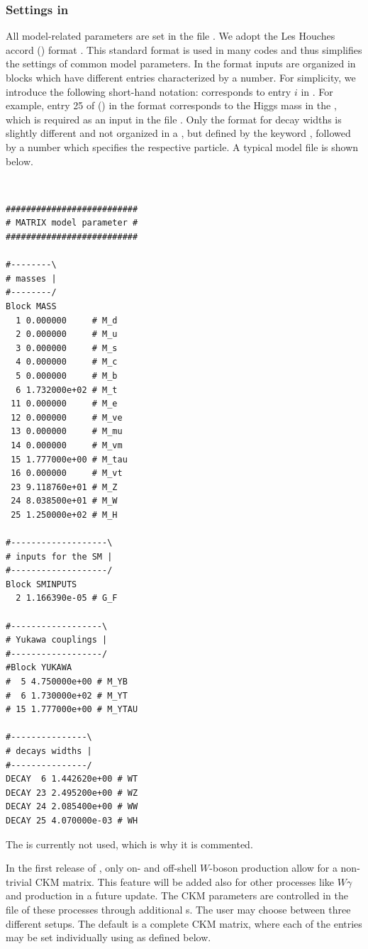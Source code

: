 \documentclass[english,11pt]{article}
\begin{document}
\subsubsection{Settings in }\label{sec:model}
All model-related parameters are set in the file . We adopt 
the \susy{} Les Houches accord (\slha{}) format \cite{Skands:2003cj}. This standard 
format is used in many codes and thus simplifies the settings of common 
model parameters. In the \slha{} format inputs are organized in blocks which have different entries characterized by a number. For 
simplicity, we introduce the following short-hand notation:  corresponds to entry $i$ in . 
For example, entry 25 of  () in the \slha{} format corresponds to the Higgs mass in the \sm{}, which 
is required as an input in the file . Only the format for decay widths is slightly different and not organized in a , but defined by the keyword , followed by a number which specifies the respective particle. A typical model file is shown below.

\lstset{basicstyle=\scriptsize, frame=single}
{\tt
\begin{lstlisting}
##########################
# MATRIX model parameter #
##########################

#--------\
# masses |
#--------/
Block MASS
  1 0.000000     # M_d 
  2 0.000000     # M_u
  3 0.000000     # M_s
  4 0.000000     # M_c
  5 0.000000     # M_b 
  6 1.732000e+02 # M_t
 11 0.000000     # M_e 
 12 0.000000     # M_ve
 13 0.000000     # M_mu
 14 0.000000     # M_vm
 15 1.777000e+00 # M_tau
 16 0.000000     # M_vt
 23 9.118760e+01 # M_Z 
 24 8.038500e+01 # M_W
 25 1.250000e+02 # M_H 

#-------------------\
# inputs for the SM |
#-------------------/
Block SMINPUTS
  2 1.166390e-05 # G_F 

#------------------\
# Yukawa couplings |
#------------------/
#Block YUKAWA 
#  5 4.750000e+00 # M_YB 
#  6 1.730000e+02 # M_YT 
# 15 1.777000e+00 # M_YTAU 

#---------------\
# decays widths |
#---------------/
DECAY  6 1.442620e+00 # WT 
DECAY 23 2.495200e+00 # WZ 
DECAY 24 2.085400e+00 # WW 
DECAY 25 4.070000e-03 # WH
\end{lstlisting}
}
The \matrixparam{Block}  is currently not used, which is why it is commented. 

In the first release of \Matrix{}, only on- and off-shell $W$-boson 
production allow for a non-trivial CKM matrix. This feature will be added also for other 
processes like $W\gamma$ and \wz{} production in a future update.
\label{sec:CKM}
The CKM parameters are controlled in the file \matrixparam{model.dat} of these processes through additional s. 
The user may choose between three different setups. The default is a complete CKM matrix, where each of the entries may be set 
individually using \block{CKM} as defined below.
\end{document}
